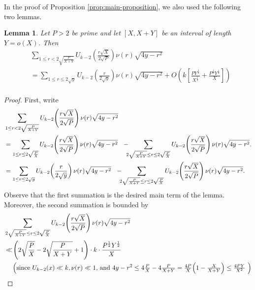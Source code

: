 \documentclass[12pt,letterpaper,reqno]{amsart}
\theoremstyle{plain}
\newtheorem{lemma}[theorem]{Lemma}
\theoremstyle{definition}
\numberwithin{equation}{section}
\numberwithin{figure}{section}
\numberwithin{table}{section}
\newcommand{\lrp}[1]{\!\left(#1\right)}
\newcommand{\lrb}[1]{\!\left[#1\right]}
\begin{document}
In the proof of Proposition \ref{prop:main-proposition}, we also used the following two lemmas.
\begin{lemma}\label{lem:Uk-split-main-error}
    Let $P > 2$ be prime and let $[X, X+Y]$ be an interval of length $Y = o(X)$. Then
    \begin{align}
        & \sum_{1\leq r < 2\sqrt{\frac{P}{X+Y}}} 
        U_{k-2}\lrp{\frac{r\sqrt{X}}{2\sqrt{P}}}\nu(r)\sqrt{4y-r^2} \\
        &= \sum_{1\leq r\leq 2\sqrt{y}} U_{k-2}\lrp{\frac{r}{2\sqrt{y}}}\nu(r) \sqrt{4y-r^2} + O\lrp{k\lrb{\frac{PY^{\frac{3}{2}}}{X^{\frac{5}{2}}}+\frac{P^\frac{1}{2}Y^\frac{1}{2}}{X}}} \\
    \end{align}
\end{lemma}
\begin{proof}
    First, write
    \begin{align}
        &\sum_{1\leq r<2\sqrt{\frac{P}{X+Y}}} 
        U_{k-2}\lrp{\frac{r\sqrt{X}}{2\sqrt{P}}}\nu(r)\sqrt{4y-r^2} \\
        &=  \sum_{1\leq r\leq 2\sqrt{\frac{P}{X}}} 
        U_{k-2}\lrp{\frac{r\sqrt{X}}{2\sqrt{P}}}\nu(r)\sqrt{4y-r^2} 
        \ \ - \hspace{-2mm} \sum_{2\sqrt{\frac{P}{X+Y}}\leq r\leq 2\sqrt{\frac{P}{X}}} 
        U_{k-2}\lrp{\frac{r\sqrt{X}}{2\sqrt{P}}}\nu(r)\sqrt{4y-r^2}. 
        \\
        &= \sum_{1\leq r\leq 2\sqrt{y}} 
        U_{k-2}\lrp{\frac{r}{2\sqrt{y}}}\nu(r)\sqrt{4y-r^2} 
        \ \ - \hspace{-2mm}
        \sum_{2\sqrt{\frac{P}{X+Y}}\leq r\leq 2\sqrt{\frac{P}{X}}} 
        U_{k-2}\lrp{\frac{r\sqrt{X}}{2\sqrt{P}}}\nu(r)\sqrt{4y-r^2}.
    \end{align}
    Observe that the first summation is the desired main term of the lemma. Moreover, the second summation is bounded by
    \begin{align} 
        &\sum_{2\sqrt{\frac{P}{X+Y}}\leq r \le 2\sqrt{\frac{P}{X}}} U_{k-2}\lrp{\frac{r\sqrt{X}}{2\sqrt{P}}}\nu(r)\sqrt{4y-r^2} \\
        &\ll \lrp{2\sqrt{\frac{P}{X}}-2\sqrt{\frac{P}{X+Y}}+1}
        \cdot k \cdot
        \frac{P^\frac{1}{2}Y^\frac{1}{2}}{X} 
        \label{eqn:temp_+1_for_range_length}
        \\
        &\quad\    \text{\Big(since $U_{k-2}(x)\ll k,  \nu(r)\ll 1$, and $4y-r^2 \le 4 \tfrac{P}{X} - 4 \tfrac{P}{X+Y} = \tfrac{4P}{X} \lrp{1- \tfrac{X}{X+Y}} \le \tfrac{4PY}{X^2}$ \Big)} \\

\end{align}
\end{proof}
\end{document}

